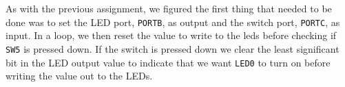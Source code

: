 As with the previous assignment, we figured the first thing that needed to be done was to set the LED port, \texttt{PORTB}, as output and the switch port, \texttt{PORTC}, as input. In a loop, we then reset the value to write to the leds before checking if \texttt{SW5} is pressed down. If the switch is pressed down we clear the least significant bit in the LED output value to indicate that we want \texttt{LED0} to turn on before writing the value out to the LEDs.
